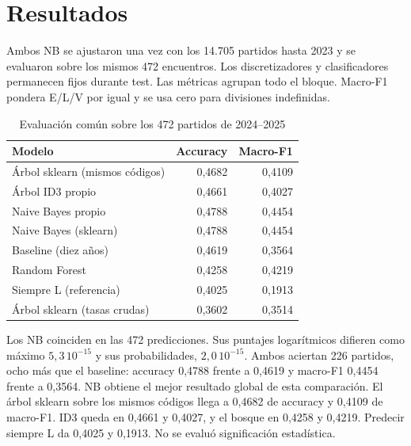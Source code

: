 \documentclass[conference]{IEEEtran}
\begin{document}
\section{Resultados}
\label{sec:resultados}

Ambos NB se ajustaron una vez con los 14.705 partidos hasta 2023 y se evaluaron sobre los mismos 472 encuentros. Los discretizadores y clasificadores permanecen fijos durante test. Las métricas agrupan todo el bloque. Macro-F1 pondera E/L/V por igual y se usa cero para divisiones indefinidas.

\begin{table}[htbp]
\caption{Evaluación común sobre los 472 partidos de 2024--2025}
\label{tab:resultados}
\centering
\begin{tabular}{lrr}
\hline
Modelo & Accuracy & Macro-F1 \\
\hline
Árbol sklearn (mismos códigos) & 0,4682 & 0,4109 \\
Árbol ID3 propio & 0,4661 & 0,4027 \\
Naive Bayes propio & 0,4788 & 0,4454 \\
Naive Bayes (sklearn) & 0,4788 & 0,4454 \\
Baseline (diez años) & 0,4619 & 0,3564 \\
Random Forest & 0,4258 & 0,4219 \\
Siempre L (referencia) & 0,4025 & 0,1913 \\
Árbol sklearn (tasas crudas) & 0,3602 & 0,3514 \\
\hline
\end{tabular}
\end{table}

Los NB coinciden en las 472 predicciones. Sus puntajes logarítmicos difieren como máximo $5{,}3\,10^{-15}$ y sus probabilidades, $2{,}0\,10^{-15}$. Ambos aciertan 226 partidos, ocho más que el baseline: accuracy 0,4788 frente a 0,4619 y macro-F1 0,4454 frente a 0,3564. NB obtiene el mejor resultado global de esta comparación. El árbol sklearn sobre los mismos códigos llega a 0,4682 de accuracy y 0,4109 de macro-F1. ID3 queda en 0,4661 y 0,4027, y el bosque en 0,4258 y 0,4219. Predecir siempre L da 0,4025 y 0,1913. No se evaluó significación estadística.
\end{document}
